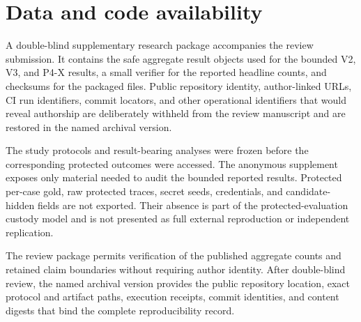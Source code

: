 \section{Data and code availability}
\label{sec:availability}

A double-blind supplementary research package accompanies the review submission. It contains the safe aggregate result objects used for the bounded V2, V3, and P4-X results, a small verifier for the reported headline counts, and checksums for the packaged files. Public repository identity, author-linked URLs, CI run identifiers, commit locators, and other operational identifiers that would reveal authorship are deliberately withheld from the review manuscript and are restored in the named archival version.

The study protocols and result-bearing analyses were frozen before the corresponding protected outcomes were accessed. The anonymous supplement exposes only material needed to audit the bounded reported results. Protected per-case gold, raw protected traces, secret seeds, credentials, and candidate-hidden fields are not exported. Their absence is part of the protected-evaluation custody model and is not presented as full external reproduction or independent replication.

The review package permits verification of the published aggregate counts and retained claim boundaries without requiring author identity. After double-blind review, the named archival version provides the public repository location, exact protocol and artifact paths, execution receipts, commit identities, and content digests that bind the complete reproducibility record.
